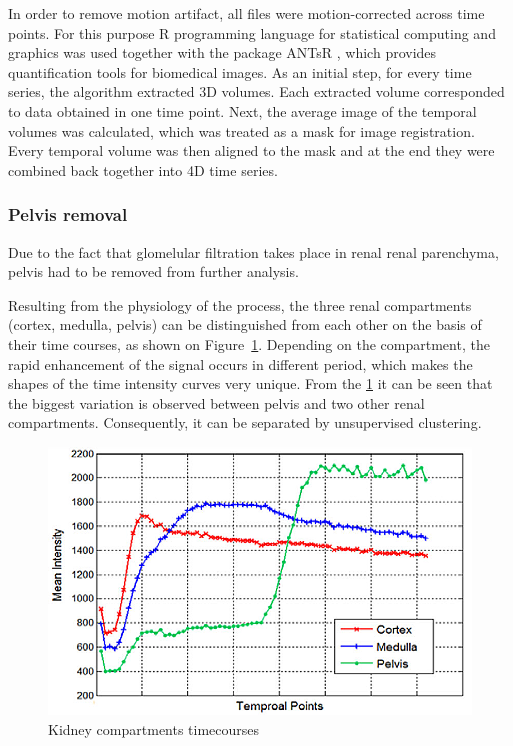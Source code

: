 In order to remove motion artifact, all files were motion-corrected across time points. For this purpose R programming language for statistical computing and graphics was used \cite{R} together with the package ANTsR \cite{ANTsR}, which provides quantification tools for biomedical images. As an initial step, for every time series, the algorithm extracted 3D volumes. Each extracted volume corresponded to data obtained in one time point. Next, the average image of the temporal volumes was calculated, which was treated as a mask for image registration. Every temporal volume was then aligned to the mask and at the end they were combined back together into 4D time series.

\subsubsection{Pelvis removal}
Due to the fact that glomelular filtration takes place in renal renal parenchyma, pelvis had to be removed from further analysis. 

Resulting from the physiology of the process, the three renal compartments (cortex, medulla, pelvis) can be distinguished from each other on the basis of their time courses, as shown on Figure~\ref{fig:timecourses}. Depending on the compartment, the rapid enhancement of the signal occurs in different period, which makes the shapes of the time intensity curves very unique.
From the \ref{fig:timecourses} it can be seen that the biggest variation is observed between pelvis and two other renal compartments.    Consequently, it can be separated by unsupervised clustering. 

\begin{figure}[H]
	\centering
	\includegraphics{img/timecourses}
	\caption{Kidney compartments timecourses  \cite{KidneySubsegmentation}}
	\label{fig:timecourses}
\end{figure}


